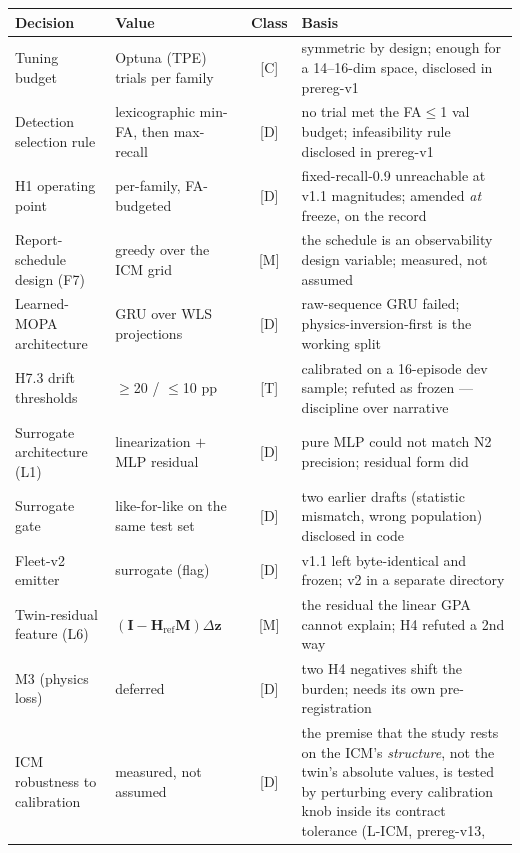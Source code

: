 \begin{center}\footnotesize\setlength{\tabcolsep}{4pt}
\begin{tabular}{>{\raggedright\arraybackslash}p{}>{\raggedright\arraybackslash}p{}c>{\raggedright\arraybackslash}p{}}
  \toprule
  Decision & Value & Class & Basis \\
  \midrule
Tuning budget & 50 Optuna (TPE) trials per family & [C] & symmetric by design; enough for a
    14--16-dim space, disclosed in prereg-v1 \\
  Detection selection rule & lexicographic min-FA, then max-recall & [D] & no trial met the
    FA$\leq$1 val budget; infeasibility rule disclosed in prereg-v1 \\
  H1 operating point & per-family, FA-budgeted & [D] & fixed-recall-0.9 unreachable at v1.1
    magnitudes; amended \emph{at} freeze, on the record \\
  Report-schedule design (F7) & greedy over the ICM grid & [M] & the schedule is an
    observability design variable; measured, not assumed \\
  Learned-MOPA architecture & GRU over WLS projections & [D] & raw-sequence GRU
    failed; physics-inversion-first is the working split \\
  H7.3 drift thresholds & $\geq$20 / $\leq$10 pp & [T] & calibrated on a 16-episode dev sample;
    refuted as frozen --- discipline over narrative \\
  Surrogate architecture (L1) & linearization $+$ MLP residual & [D] & pure MLP could not match
    N2 precision; residual form did \\
  Surrogate gate & like-for-like on the same test set & [D] & two earlier drafts (statistic
    mismatch, wrong population) disclosed in code \\
  Fleet-v2 emitter & surrogate (flag) & [D] & v1.1 left byte-identical and frozen;
    v2 in a separate directory \\
  Twin-residual feature (L6) & $(\mathbf{I}-\mathbf{H}_{\text{ref}}\mathbf{M})\Delta\mathbf{z}$
    & [M] & the residual the linear GPA cannot explain; H4 refuted a 2nd way \\
  M3 (physics loss) & deferred & [D] & two H4 negatives shift the burden; needs its own
    pre-registration \\
  ICM robustness to calibration & measured, not assumed & [D] & the premise that the study
    rests on the ICM's \emph{structure}, not the twin's absolute values, is tested by
    perturbing every calibration knob inside its contract tolerance (L-ICM, prereg-v13,

\end{tabular}
\end{center}
